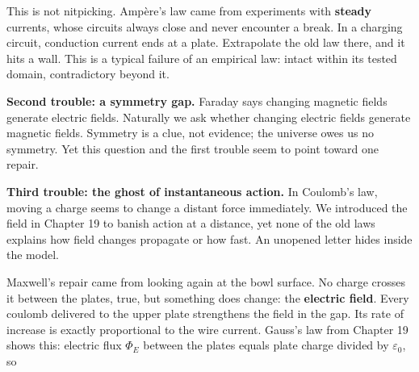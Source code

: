 \begin{center}
\end{center}

This is not nitpicking. Ampère's law came from experiments with \textbf{steady} currents, whose circuits always close and never encounter a break. In a charging circuit, conduction current ends at a plate. Extrapolate the old law there, and it hits a wall. This is a typical failure of an empirical law: intact within its tested domain, contradictory beyond it.

\textbf{Second trouble: a symmetry gap.} Faraday says changing magnetic fields generate electric fields. Naturally we ask whether changing electric fields generate magnetic fields. Symmetry is a clue, not evidence; the universe owes us no symmetry. Yet this question and the first trouble seem to point toward one repair.

\textbf{Third trouble: the ghost of instantaneous action.} In Coulomb's law, moving a charge seems to change a distant force immediately. We introduced the field in Chapter 19 to banish action at a distance, yet none of the old laws explains how field changes propagate or how fast. An unopened letter hides inside the model.


Maxwell's repair came from looking again at the bowl surface. No charge crosses it between the plates, true, but something does change: the \textbf{electric field}. Every coulomb delivered to the upper plate strengthens the field in the gap. Its rate of increase is exactly proportional to the wire current. Gauss's law from Chapter 19 shows this: electric flux \(\varPhi_E\) between the plates equals plate charge divided by \(\varepsilon_0\), so

